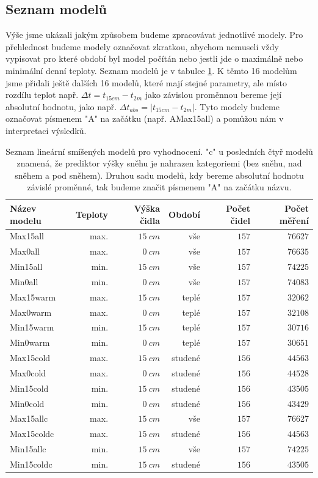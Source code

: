 \subsection{Seznam modelů}
Výše jsme ukázali jakým způsobem budeme zpracovávat jednotlivé modely. Pro přehlednost budeme modely označovat zkratkou, abychom nemuseli vždy vypisovat pro které období byl model počítán nebo jestli jde o maximálně nebo minimální denní teploty. Seznam modelů je v tabulce \ref{tab:seznammodelu}. K těmto 16 modelům jsme přidali ještě dalších 16 modelů, které mají stejné parametry, ale místo rozdílu teplot např. $\Delta t = t_{15cm} - t_{2m}$ jako závislou proměnnou bereme její absolutní hodnotu, jako např. $\Delta t_{abs} = \left|t_{15cm} - t_{2m}\right|$. Tyto modely budeme označovat písmenem "A" na začátku (např. AMax15all) a pomůžou nám v interpretaci výsledků.

\begin{table}
\centering\footnotesize\sf
\begin{tabular}{lrrrrr}
\toprule
	Název modelu & Teploty & Výška čidla & Období & Počet čidel & Počet měření \\
\midrule
	Max15all & max. & $\SI{15}{cm}$ & vše & $157$ & $76627$ \\
	Max0all & max. & $\SI{0}{cm}$ & vše & $157$ & $76635$ \\
	Min15all & min. & $\SI{15}{cm}$ & vše & $157$ & $74225$ \\
	Min0all & min. & $\SI{0}{cm}$ & vše & $157$ & $74083$ \\
	Max15warm & max. & $\SI{15}{cm}$ & teplé & $157$ & $32062$ \\
	Max0warm & max. & $\SI{0}{cm}$ & teplé & $157$ & $32108$ \\
	Min15warm & min. & $\SI{15}{cm}$ & teplé & $157$ & $30716$ \\
	Min0warm & min. & $\SI{0}{cm}$ & teplé & $157$ & $30651$ \\
	Max15cold & max. & $\SI{15}{cm}$ & studené & $156$ & $44563$ \\
	Max0cold & max. & $\SI{0}{cm}$ & studené & $156$ & $44528$ \\
	Min15cold & min. & $\SI{15}{cm}$ & studené & $156$ & $43505$ \\
	Min0cold & min. & $\SI{0}{cm}$ & studené & $156$ & $43429$ \\
	Max15allc & max. & $\SI{15}{cm}$ & vše & $157$ & $76627$ \\
	Max15coldc & max. & $\SI{15}{cm}$ & studené & $156$ & $44563$ \\
	Min15allc & min. & $\SI{15}{cm}$ & vše & $157$ & $74225$ \\
	Min15coldc & min. & $\SI{15}{cm}$ & studené & $156$ & $43505$ \\
\bottomrule
\end{tabular}
	\caption{Seznam lineární smíšených modelů pro vyhodnocení. "c" u posledních čtyř modelů znamená, že prediktor výšky sněhu je nahrazen kategoriemi (bez sněhu, nad sněhem a pod sněhem). Druhou sadu modelů, kdy bereme absolutní hodnotu závislé proměnné, tak budeme značit písmenem "A" na začátku názvu.}
	\label{tab:seznammodelu}
\end{table}


